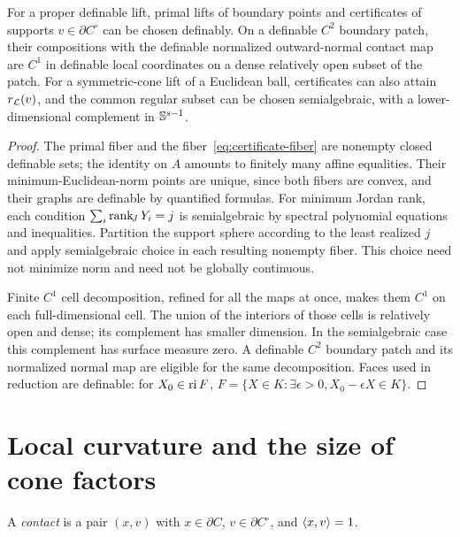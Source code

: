 \begin{lemma}\label{lem:selection}
For a proper definable lift, primal lifts of boundary points and
certificates of supports $v\in\partial C^\circ$ can be chosen definably.
On a definable $C^2$ boundary patch, their compositions with the definable
normalized outward-normal contact map are $C^1$ in definable local coordinates on a dense relatively
open subset of the patch. For a symmetric-cone lift of a Euclidean ball,
certificates can also attain $r_{\mathcal L}(v)$, and the common
regular subset can be chosen semialgebraic, with a lower-dimensional
complement in $\mathbb S^{s-1}$.
\end{lemma}
\begin{proof}
The primal fiber and the fiber~\eqref{eq:certificate-fiber} are nonempty
closed definable sets; the identity on $A$ amounts to finitely many affine
equalities. Their minimum-Euclidean-norm points are unique, since both
fibers are convex, and their graphs are definable by quantified formulas.
For minimum Jordan rank, each condition $\sum_i\operatorname{rank}_{\!J} Y_i=j$ is
semialgebraic by spectral polynomial equations and inequalities.
Partition the support sphere according to the least realized $j$ and
apply semialgebraic choice in each resulting nonempty fiber. This choice
need not minimize norm and need not be globally continuous.

Finite $C^1$ cell decomposition, refined for all the maps at once, makes
them $C^1$ on each full-dimensional cell. The union of the interiors of
those cells is relatively open and dense; its complement has smaller
dimension. In the semialgebraic case this complement has surface measure
zero. A definable $C^2$ boundary patch and its normalized normal map are
eligible for the same decomposition. Faces used in reduction are definable:
for $X_0\in\operatorname{ri} F$,
$F=\{X\in K:\exists\epsilon>0, X_0-\epsilon X\in K\}$.
\end{proof}

\section{Local curvature and the size of cone factors}\label{sec:curvature}
A \emph{contact} is a pair $(x,v)$ with $x\in\partial C$,
$v\in\partial C^\circ$, and $\langle x,v\rangle=1$.

